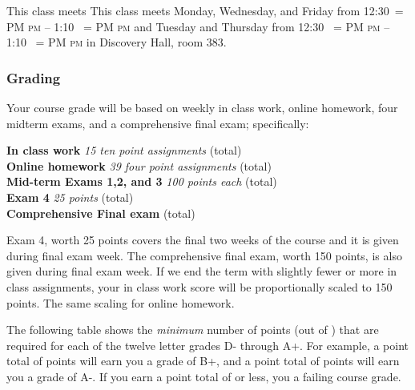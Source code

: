 \documentclass[12pt]{article}
\makeatletter
\newcounter{ex}\setcounter{ex}{0}
\newenvironment{mypar}[2]
  {\begin{list}{}%
    {\setlength\leftmargin{#1}
    \setlength\rightmargin{#2}}
    \item[]}
  {\end{list}}
\DeclareRobustCommand{\maybefakesc}[1]{%
  \ifnum\pdfstrcmp{\f@series}{\bfdefault}=\z@
    {\fontsize{\dimexpr0.8\dimexpr\f@size pt\relax}{0}\selectfont\uppercase{#1}}%
  \else
    \textsc{#1}%
  \fi
}
\newcommand\PM{\,\maybefakesc{pm}\xspace}
\newcommand{\room}{Discovery Hall, room  383}
\newcommand{\meetingtime}{This class meets Monday, Wednesday, and Friday  from 
	12:30\PM{}  --  1:10 \PM and Tuesday and Thursday from 12:30 \PM{} -- 1:10 \PM }
\makeatother
\begin{document}
This class meets \meetingtime{} in \room.


\subsubsection*{Grading}

Your course grade will be based on weekly in class work, online homework, four midterm exams, and a comprehensive 
final exam; specifically:
\begin{mypar}{0.25in}{0.25in}
    \textbf{In class work}  \emph{15 ten point assignments}   (total) \\
     \textbf{Online homework} \emph{39 four point assignments } (total)\\
    \textbf{Mid-term Exams 1,2, and 3} \emph{100 points each}  (total)\\
   \textbf{Exam 4} \emph{25 points}  (total)\\ 
      \textbf{Comprehensive Final exam}  (total)
\end{mypar}
Exam 4, worth 25 points covers the final two weeks of the course and it is given 
during final exam week. The comprehensive final exam, worth 150 points, is also 
given during final exam week. If we end the term with slightly fewer or more in class
assignments, your in class work score will be proportionally scaled to 150 points. The same 
scaling for online homework.






The following table shows the \emph{minimum} number of points (out of \points) that
are required for each of the twelve letter grades D- through A+. For
example, a point total of \Bp\/  points will earn you a grade of B+,  and 
a point total of \Am\/ points will earn you a grade of A-. If you earn a point
total of \F\/  or less, you a failing course grade.
 
\end{document}
